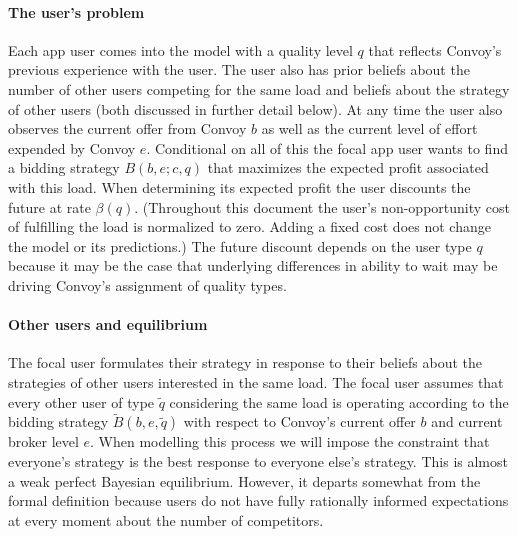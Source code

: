 \documentclass[12pt]{article}
\begin{document}
\paragraph{The user's problem}
Each app user comes into the model with a quality level $q$ that reflects Convoy's previous experience with the user. The user also has prior beliefs about the number of other users competing for the same load and beliefs about the strategy of other users (both discussed in further detail below). At any time the user also observes the current offer from Convoy $b$ as well as the current level of effort expended by Convoy $e$. Conditional on all of this the focal app user wants to find a bidding strategy $B\left(b,e;c,q\right)$ that maximizes the expected profit associated with this load. When determining its expected profit the user discounts the future at rate $\beta\left(q\right)$. (Throughout this document the user's non-opportunity cost of fulfilling the load is normalized to zero. Adding a fixed cost does not change the model or its predictions.) The future discount depends on the user type $q$ because it may be the case that underlying differences in ability to wait may be driving Convoy's assignment of quality types.

\paragraph{Other users and equilibrium}
The focal user formulates their strategy in response to their beliefs about the strategies of other users interested in the same load. The focal user assumes that every other user of type $\tilde{q}$ considering the same load is operating according to the bidding strategy $\tilde{B}\left(b,e,\tilde{q}\right)$ with respect to Convoy's current offer $b$ and current broker level $e$. When modelling this process we will impose the constraint that everyone's strategy is the best response to everyone else's strategy. This is almost a weak perfect Bayesian equilibrium. However, it departs somewhat from the formal definition because users do not have fully rationally informed expectations at every moment about the number of competitors.
\end{document}
